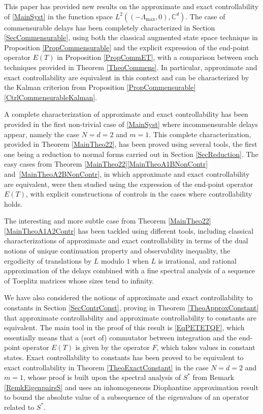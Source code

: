 \documentclass[10pt]{amsart}
\theoremstyle{plain}
\theoremstyle{definition}
\begin{document}
This paper has provided new results on the approximate and exact controllability of \eqref{MainSyst} in the function space $L^2((-\Lambda_{\max}, 0), \mathbb C^d)$. The case of commensurable delays has been completely characterized in Section \ref{SecCommensurable}, using both the classical augmented state space technique in Proposition \ref{PropCommensurable} and the explicit expression of the end-point operator $E(T)$ in Proposition \ref{PropCommET}, with a comparison between such techniques provided in Theorem \ref{TheoCommens}. In particular, approximate and exact controllability are equivalent in this context and can be characterized by the Kalman criterion from Proposition \ref{PropCommensurable}\eqref{CtrlCommensurableKalman}.

A complete characterization of approximate and exact controllability has been provided in the first non-trivial case of \eqref{MainSyst} where incommensurable delays appear, namely the case $N = d = 2$ and $m = 1$. This complete characterization, provided in Theorem \ref{MainTheo22}, has been proved using several tools, the first one being a reduction to normal forms carried out in Section \ref{SecReduction}. The easy cases from Theorem \ref{MainTheo22}\eqref{MainTheoA1BNonContr} and~\eqref{MainTheoA2BNonContr}, in which approximate and exact controllability are equivalent, were then studied using the expression of the end-point operator $E(T)$, with explicit constructions of controls in the cases where controllability holds.

The interesting and more subtle case from Theorem \ref{MainTheo22}\eqref{MainTheoA1A2Contr} has been tackled using different tools, including classical characterizations of approximate and exact controllability in terms of the dual notions of unique continuation property and observability inequality, the ergodicity of translations by $L$ modulo $1$ when $L$ is irrational, and rational approximation of the delays combined with a fine spectral analysis of a sequence of Toeplitz matrices whose sizes tend to infinity.

We have also considered the notions of approximate and exact controllability to constants in Section \ref{SecContrConst}, proving in Theorem \ref{TheoApproxConstant} that approximate controllability and approximate controllability to constants are equivalent. The main tool in the proof of this result is \eqref{EqPETETQF}, which essentially means that a (sort of) commutator between integration and the end-point operator $E(T)$ is given by the operator $F$, which takes values in constant states. Exact controllability to constants has been proved to be equivalent to exact controllability in Theorem \ref{TheoExactConstant} in the case $N = d = 2$ and $m = 1$, whose proof is built upon the spectral analysis of $S^\ast$ from Remark \ref{RemkEigenpairsS} and uses an inhomogeneous Diophantine approximation result to bound the absolute value of a subsequence of the eigenvalues of an operator related to $S^\ast$.
\end{document}
